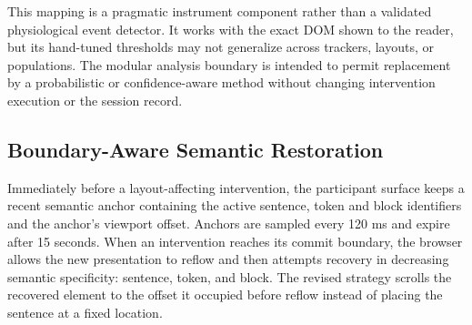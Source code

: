 \documentclass[sigconf,review,anonymous]{acmart}
\begin{document}
This mapping is a pragmatic instrument component rather than a validated physiological event detector.
It works with the exact DOM shown to the reader, but its hand-tuned thresholds may not generalize across trackers, layouts, or populations.
The modular analysis boundary is intended to permit replacement by a probabilistic or confidence-aware method \cite{kaltenberger2026confla} without changing intervention execution or the session record.

\subsection{Boundary-Aware Semantic Restoration}

Immediately before a layout-affecting intervention, the participant surface keeps a recent semantic anchor containing the active sentence, token and block identifiers and the anchor's viewport offset.
Anchors are sampled every 120 ms and expire after 15 seconds.
When an intervention reaches its commit boundary, the browser allows the new presentation to reflow and then attempts recovery in decreasing semantic specificity: sentence, token, and block.
The revised strategy scrolls the recovered element to the offset it occupied before reflow instead of placing the sentence at a fixed location.
\end{document}
